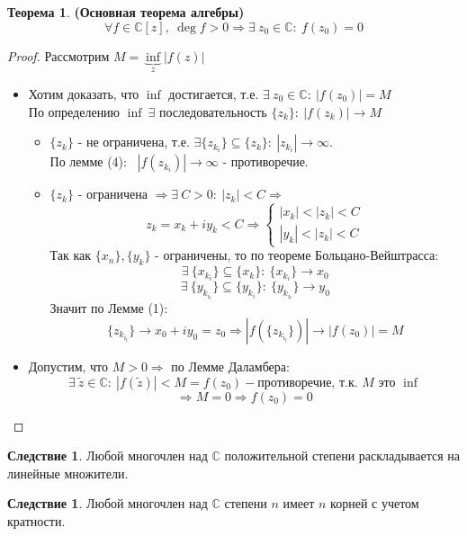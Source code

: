 \documentclass[a4paper, 12pt]{article}
\newcounter{concount}
\theoremstyle{definition}
\newtheorem*{theorem}{Теорема}
\newtheorem{consequensenum}[concount]{Следствие}
\begin{document}
  \begin{theorem} \textbf{(Основная теорема алгебры)} 
    $$\forall f \in \mathbb{C}[z], \ \deg f >0 \Longrightarrow  \exists \ z_0 \in \mathbb{C}: \ f(z_0) = 0$$
  \end{theorem}
  \begin{proof}
    Рассмотрим $M = \underbrace{\inf}_{z} |f(z)|$
    \begin{itemize}
      \item[\textit{1 шаг.}] Хотим доказать, что $\inf$ достигается, т.е. $\exists \ z_0 \in \mathbb{C}: \ |f(z_0)| = M$\\
      По определению $\inf \ \exists$ последовательность $\{z_k\}: \ |f(z_k)| \to M$
      \begin{itemize}
        \item[1 случай.] $\{z_k\}$  - не ограничена, т.е. $\exists  \{z_{k_i}\}\subseteq \{z_k\}: \ |z_{k_i}| \to \infty$. \\
        По лемме (4): \ $|f(z_{k_i})| \to \infty$ - противоречие. 
        \item[2 случай.] $\{z_k\}$ - ограничена $\Longrightarrow \exists \ C > 0: \ |z_k | < C \Longrightarrow$   
        $$z_k = x_k + iy_k < C \Longrightarrow \begin{cases}
          |x_k|<|z_k|<C \\
          |y_k|<|z_k|<C
        \end{cases}$$
        Так как $\{x_n\}, \{y_k\}$ - ограничены, то по теореме Больцано-Вейштрасса:
        $$\exists \ \{x_{k_{i}}\}\subseteq \{x_{k}\}: \ \{x_{k_{i}}\} \to x_0$$
        $$\exists \ \{y_{k_{i_l}}\}\subseteq \{y_{k_{i}}\}: \ \{y_{k_{i_l}}\} \to y_0$$
        Значит по Лемме (1):
        $$\{z_{k_{i_l}}\} \to x_0 + iy_0 = z_0 \Longrightarrow |f(\{z_{k_{i_l}}\})| \to |f(z_0)| = M$$  
      \end{itemize}
      \item[\textit{2 шаг.}] Допустим, что $M>0 \Longrightarrow$ по Лемме Даламбера:
      $$\exists \ \widetilde{z} \in \mathbb{C}: \ |f(\widetilde{z})|<M = f(z_0) - \text{противоречие, т.к. } M \text{ это } \inf $$
      $$\Longrightarrow M=0 \Longrightarrow f(z_0) =0$$  
    \end{itemize}
  \end{proof} 
  \begin{consequensenum}
    Любой многочлен над $\mathbb{C}$ положительной степени раскладывается на линейные множители. 
  \end{consequensenum}
  \begin{consequensenum}
    Любой многочлен над $\mathbb{C}$ степени $n$ имеет $n$ корней с учетом кратности. 
  \end{consequensenum} 
\end{document}
